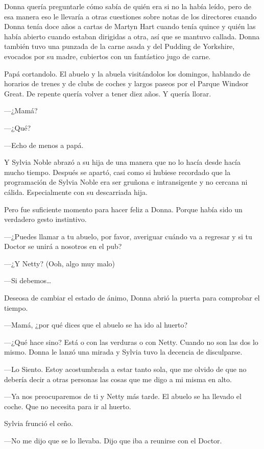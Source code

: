 Donna quería preguntarle cómo sabía de quién era si no la había leído,
pero de esa manera eso le llevaría a otras cuestiones sobre notas de los
directores cuando Donna tenía doce años a cartas de Martyn Hart cuando
tenía quince y quién las había abierto cuando estaban dirigidas a otra,
así que se mantuvo callada. Donna también tuvo una punzada de la carne
asada y del Pudding de Yorkshire, evocados por su madre, cubiertos con
un fantástico jugo de carne.

Papá cortandolo. El abuelo y la abuela visitándolos los domingos,
hablando de horarios de trenes y de clubs de coches y largos paseos por
el Parque Windsor Great. De repente quería volver a tener diez años. Y
quería llorar.

---¿Mamá?

---¿Qué?

---Echo de menos a papá.

Y Sylvia Noble abrazó a su hija de una manera que no lo hacía desde
hacía mucho tiempo. Después se apartó, casi como si hubiese recordado
que la programación de Sylvia Noble era ser gruñona e intransigente y no
cercana ni cálida. Especialmente con su descarriada hija.

Pero fue suficiente momento para hacer feliz a Donna. Porque había sido
un verdadero gesto instintivo.

---¿Puedes llamar a tu abuelo, por favor, averiguar cuándo va a regresar
y si tu Doctor se unirá a nosotros en el pub?

---¿Y Netty? (Ooh, algo muy malo)

---Si debemos\ldots{}

Deseosa de cambiar el estado de ánimo, Donna abrió la puerta para
comprobar el tiempo.

---Mamá, ¿por qué dices que el abuelo se ha ido al huerto?

---¿Qué hace sino? Está o con las verduras o con Netty. Cuando no son
las dos lo mismo. Donna le lanzó una mirada y Sylvia tuvo la decencia de
disculparse.

---Lo Siento. Estoy acostumbrada a estar tanto sola, que me olvido de
que no debería decir a otras personas las cosas que me digo a mi misma
en alto.

---Ya nos preocuparemos de ti y Netty más tarde. El abuelo se ha llevado
el coche. Que no necesita para ir al huerto.

Sylvia frunció el ceño.

---No me dijo que se lo llevaba. Dijo que iba a reunirse con el Doctor.

